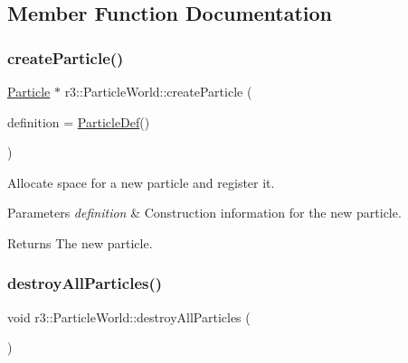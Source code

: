 \subsection{Member Function Documentation}
\mbox{\label{classr3_1_1_particle_world_a467a56ef835bbd7c3a23b722db81fa5e}} 
\subsubsection{\texorpdfstring{create\+Particle()}{createParticle()}}
{\footnotesize\ttfamily \mbox{\hyperlink{classr3_1_1_particle}{Particle}} $\ast$ r3\+::\+Particle\+World\+::create\+Particle (\begin{DoxyParamCaption}\item[{\mbox{\hyperlink{structr3_1_1_particle_def}{Particle\+Def}}}]{definition = {\ttfamily \mbox{\hyperlink{structr3_1_1_particle_def}{Particle\+Def}}()} }\end{DoxyParamCaption})}



Allocate space for a new particle and register it. 


\begin{DoxyParams}{Parameters}
{\em definition} & Construction information for the new particle. \\
\hline
\end{DoxyParams}
\begin{DoxyReturn}{Returns}
The new particle. 
\end{DoxyReturn}
\mbox{\label{classr3_1_1_particle_world_aa061b4eab09216fb7e3a8d08cbdb6dd2}} 
\subsubsection{\texorpdfstring{destroy\+All\+Particles()}{destroyAllParticles()}}
{\footnotesize\ttfamily void r3\+::\+Particle\+World\+::destroy\+All\+Particles (\begin{DoxyParamCaption}{ }\end{DoxyParamCaption})}



